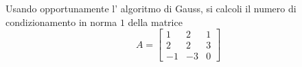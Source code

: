 Usando opportunamente  l' algoritmo di Gauss, si calcoli il numero di condizionamento in norma $1$ della matrice
\bigskip
\[
A=\left[
\begin{array}{ccc}
1 & 2 & 1 \\
2 & 2 & 3\\
-1 & -3 & 0
\end{array}\right]
\]

